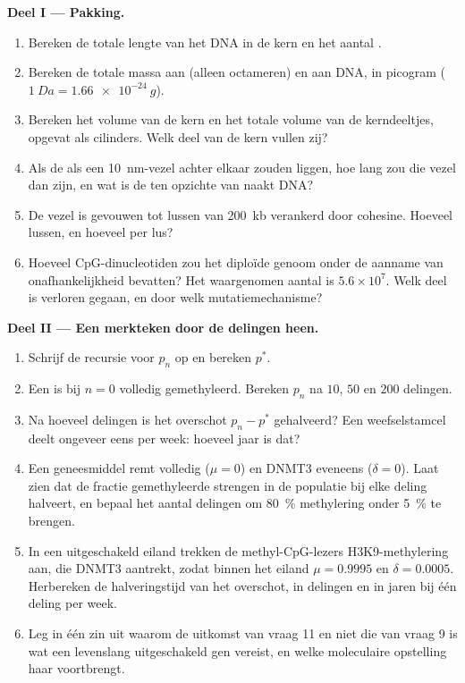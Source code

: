 \begin{problem}
\medskip
\noindent\textbf{Deel I --- Pakking.}
\begin{enumerate}
  \item Bereken de totale lengte van het DNA in de kern en het aantal
        .
  \item Bereken de totale massa aan  (alleen octameren) en aan
        DNA, in picogram ($\qty{1}{Da} = \qty{1.66e-24}{g}$).
  \item Bereken het volume van de kern en het totale volume van de
        kerndeeltjes, opgevat als cilinders. Welk deel van de kern
        vullen zij?
  \item Als de  als een \qty{10}{nm}-vezel achter elkaar
        zouden liggen, hoe lang zou die vezel dan zijn, en wat is de
         ten opzichte van naakt DNA?
  \item De vezel is gevouwen tot lussen van \qty{200}{kb} verankerd
        door cohesine. Hoeveel lussen, en hoeveel  per lus?
  \item Hoeveel CpG-dinucleotiden zou het diploïde genoom onder de
        aanname van onafhankelijkheid bevatten? Het waargenomen aantal
        is $5.6\times 10^{7}$. Welk deel is verloren gegaan, en door
        welk mutatiemechanisme?
\end{enumerate}

\medskip
\noindent\textbf{Deel II --- Een merkteken door de delingen heen.}
\begin{enumerate}[resume]
  \item Schrijf de recursie voor $p_{n}$ op en bereken $p^{*}$.
  \item Een  is bij $n = 0$ volledig gemethyleerd. Bereken
        $p_{n}$ na $10$, $50$ en $200$ delingen.
  \item Na hoeveel delingen is het overschot $p_{n} - p^{*}$ gehalveerd?
        Een weefselstamcel deelt ongeveer eens per week: hoeveel jaar
        is dat?
  \item Een geneesmiddel remt  volledig ($\mu = 0$) en DNMT3
        eveneens ($\delta = 0$). Laat zien dat de fractie gemethyleerde
        strengen in de populatie bij elke deling halveert, en bepaal
        het aantal delingen om \qty{80}{\%} methylering onder
        \qty{5}{\%} te brengen.
  \item In een uitgeschakeld eiland trekken de methyl-CpG-lezers
        H3K9-methylering aan, die DNMT3 aantrekt, zodat binnen het
        eiland $\mu = 0.9995$ en $\delta = 0.0005$. Herbereken de
        halveringstijd van het overschot, in delingen en in jaren bij
        één deling per week.
  \item Leg in één zin uit waarom de uitkomst van vraag 11 en niet die
        van vraag 9 is wat een levenslang uitgeschakeld gen vereist, en
        welke moleculaire opstelling haar voortbrengt.
\end{enumerate}


\end{problem}
